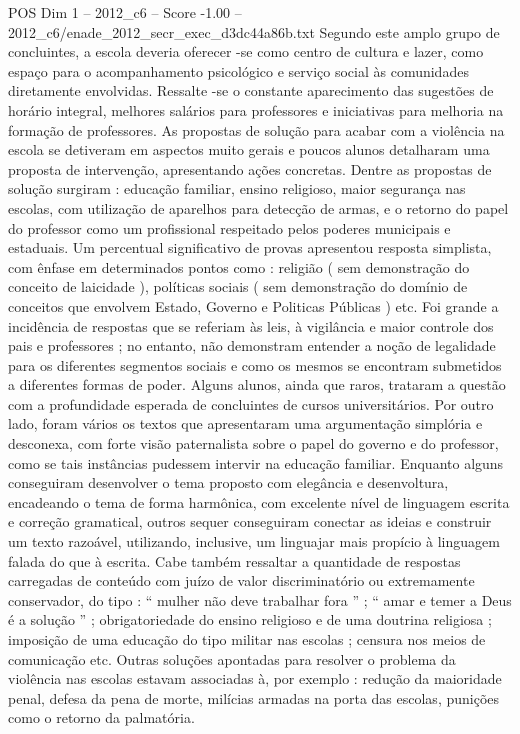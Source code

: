 \begin{textsample}{POS Dim 1 – 2012\_c6 – Score -1.00 – 2012\_c6/enade\_2012\_secr\_exec\_d3dc44a86b.txt}
Segundo este amplo grupo de concluintes, a escola deveria oferecer -se como centro de cultura e lazer, como espaço para o acompanhamento psicológico e serviço social às comunidades diretamente envolvidas.
Ressalte -se o constante aparecimento das sugestões de horário integral, melhores salários para professores e iniciativas para melhoria na formação de professores.
As propostas de solução para acabar com a violência na escola se detiveram em aspectos muito gerais e poucos alunos detalharam uma proposta de intervenção, apresentando ações concretas.
Dentre as propostas de solução surgiram : educação familiar, ensino religioso, maior segurança nas escolas, com utilização de aparelhos para detecção de armas, e o retorno do papel do professor como um profissional respeitado pelos poderes municipais e estaduais.
Um percentual significativo de provas apresentou resposta simplista, com ênfase em determinados pontos como : religião ( sem demonstração do conceito de laicidade ), políticas sociais ( sem demonstração do domínio de conceitos que envolvem Estado, Governo e Politicas Públicas ) etc.
Foi grande a incidência de respostas que se referiam às leis, à vigilância e maior controle dos pais e professores ; no entanto, não demonstram entender a noção de legalidade para os diferentes segmentos sociais e como os mesmos se encontram submetidos a diferentes formas de poder.
Alguns alunos, ainda que raros, trataram a questão com a profundidade esperada de concluintes de cursos universitários.
Por outro lado, foram vários os textos que apresentaram uma argumentação simplória e desconexa, com forte visão paternalista sobre o papel do governo e do professor, como se tais instâncias pudessem intervir na educação familiar.
Enquanto alguns conseguiram desenvolver o tema proposto com elegância e desenvoltura, encadeando o tema de forma harmônica, com excelente nível de linguagem escrita e correção gramatical, outros sequer conseguiram conectar as ideias e construir um texto razoável, utilizando, inclusive, um linguajar mais propício à linguagem falada do que à escrita.
Cabe também ressaltar a quantidade de respostas carregadas de conteúdo com juízo de valor discriminatório ou extremamente conservador, do tipo : “ mulher não deve trabalhar fora ” ; “ amar e temer a Deus é a solução ” ; obrigatoriedade do ensino religioso e de uma doutrina religiosa ; imposição de uma educação do tipo militar nas escolas ; censura nos meios de comunicação etc.
Outras soluções apontadas para resolver o problema da violência nas escolas estavam associadas à, por exemplo : redução da maioridade penal, defesa da pena de morte, milícias armadas na porta das escolas, punições como o retorno da palmatória.

\end{textsample}
